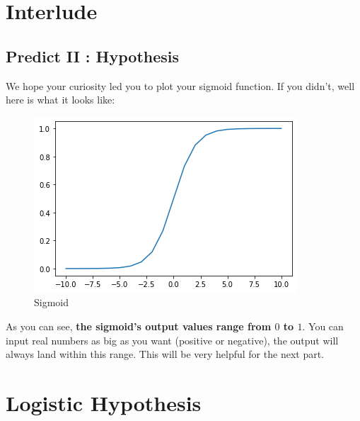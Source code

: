 
\section*{Interlude}
\subsection*{Predict II : Hypothesis}

We hope your curiosity led you to plot your sigmoid function.
If you didn't, well here is what it looks like:

\begin{figure}[!h]
    \centering
    \includegraphics[scale=0.55]{assets/sigmoid.png}
    \caption{Sigmoid}
\end{figure}

As you can see, \textbf{the sigmoid's output values range from $0$ to $1$}.  
You can input real numbers as big as you want (positive or negative), the output will always land within this range.
This will be very helpful for the next part.

\newpage

\section*{Logistic Hypothesis}

